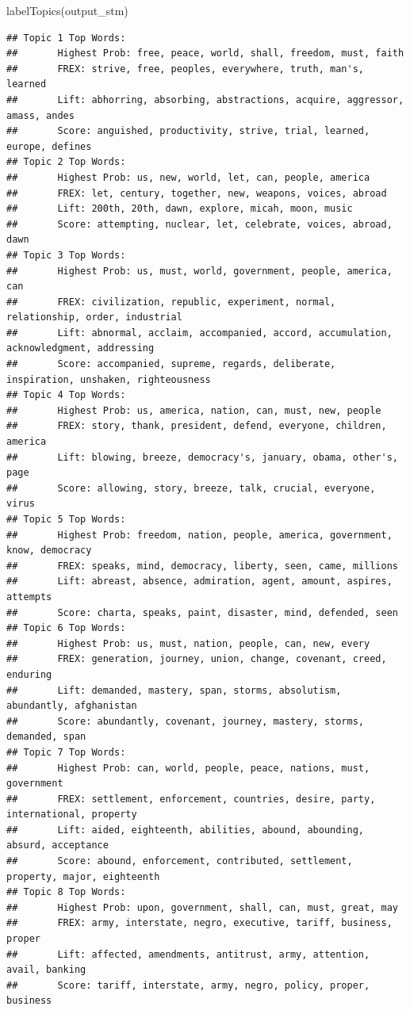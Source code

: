 \documentclass[
]{article}
\newenvironment{Shaded}{\begin{snugshade}}{\end{snugshade}}
\newcommand{\FunctionTok}[1]{\textcolor[rgb]{0.00,0.00,0.00}{#1}}
\newcommand{\NormalTok}[1]{#1}
\begin{document}
\begin{Shaded}
\begin{Highlighting}[]
\FunctionTok{labelTopics}\NormalTok{(output\_stm)}
\end{Highlighting}
\end{Shaded}

\begin{verbatim}
## Topic 1 Top Words:
##       Highest Prob: free, peace, world, shall, freedom, must, faith 
##       FREX: strive, free, peoples, everywhere, truth, man's, learned 
##       Lift: abhorring, absorbing, abstractions, acquire, aggressor, amass, andes 
##       Score: anguished, productivity, strive, trial, learned, europe, defines 
## Topic 2 Top Words:
##       Highest Prob: us, new, world, let, can, people, america 
##       FREX: let, century, together, new, weapons, voices, abroad 
##       Lift: 200th, 20th, dawn, explore, micah, moon, music 
##       Score: attempting, nuclear, let, celebrate, voices, abroad, dawn 
## Topic 3 Top Words:
##       Highest Prob: us, must, world, government, people, america, can 
##       FREX: civilization, republic, experiment, normal, relationship, order, industrial 
##       Lift: abnormal, acclaim, accompanied, accord, accumulation, acknowledgment, addressing 
##       Score: accompanied, supreme, regards, deliberate, inspiration, unshaken, righteousness 
## Topic 4 Top Words:
##       Highest Prob: us, america, nation, can, must, new, people 
##       FREX: story, thank, president, defend, everyone, children, america 
##       Lift: blowing, breeze, democracy's, january, obama, other's, page 
##       Score: allowing, story, breeze, talk, crucial, everyone, virus 
## Topic 5 Top Words:
##       Highest Prob: freedom, nation, people, america, government, know, democracy 
##       FREX: speaks, mind, democracy, liberty, seen, came, millions 
##       Lift: abreast, absence, admiration, agent, amount, aspires, attempts 
##       Score: charta, speaks, paint, disaster, mind, defended, seen 
## Topic 6 Top Words:
##       Highest Prob: us, must, nation, people, can, new, every 
##       FREX: generation, journey, union, change, covenant, creed, enduring 
##       Lift: demanded, mastery, span, storms, absolutism, abundantly, afghanistan 
##       Score: abundantly, covenant, journey, mastery, storms, demanded, span 
## Topic 7 Top Words:
##       Highest Prob: can, world, people, peace, nations, must, government 
##       FREX: settlement, enforcement, countries, desire, party, international, property 
##       Lift: aided, eighteenth, abilities, abound, abounding, absurd, acceptance 
##       Score: abound, enforcement, contributed, settlement, property, major, eighteenth 
## Topic 8 Top Words:
##       Highest Prob: upon, government, shall, can, must, great, may 
##       FREX: army, interstate, negro, executive, tariff, business, proper 
##       Lift: affected, amendments, antitrust, army, attention, avail, banking 
##       Score: tariff, interstate, army, negro, policy, proper, business
\end{verbatim}
\end{document}
